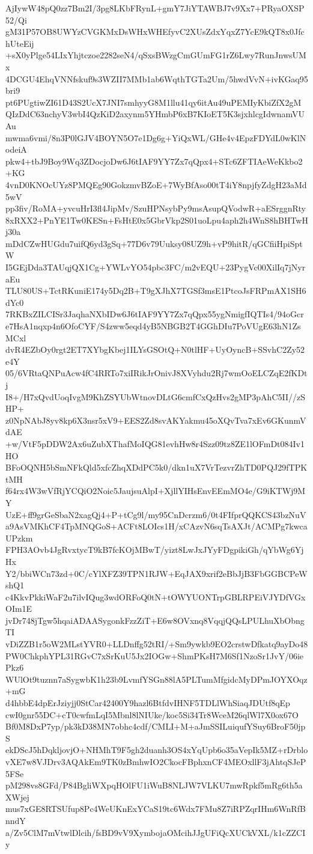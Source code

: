 AjIywW48pQ0zz7Bm2I/3pg8LKbFRynL+gmY7JiYTAWBJ7v9Xx7+PRyaOXSP52/Qi
gM31P57OB8UWYzCVGKMxDsWHxWHEfyvC2XUsZdxYqxZ7YcE9kQT8x0JfchUteEij
+sX0yPlge54LIxYhjtczoe2282seN4/qSxsBWzgCmGUmFG1rZ6Lwy7RunJnwsUMx
4DCGU4EhqVNNfskuf9s3WZII7MMb1ab6WqthTGTa2Um/5hwdVvN+ivKGaq95bri9
pt6PUgtiwZI61D43S2UcX7JNI7smhyyG8M1llu41qy6itAu49uPEMIyKbiZfX2gM
QIzDdC63nchyV3wbI4QzKiD2axynm5YHmbP6xB7KIoET5K3sjxhlcgIdwnamVUAu
mwma6vmi/8n3P0lGJV4BOYN5O7e1Dg6g+YiQxWL/GHe4v4EpzFDYdL0wKlNodeiA
pkw4+tbJ9Boy9Wq3ZDocjoDw6J6tIAF9YY7Zx7qQpx4+STc6ZFTIAeWeKkbo2+KG
4vnD0KNOcUYz8PMQEg90GokzmvBZoE+7WyBfAso00tT4iY8npjfyZdgH23aMd5wV
pp3fiv/RoMA+yvcuHrI3fl4JipMv/SzuHPNsybPy9msAsupQVodwR+aESrggnRty
8xRXX2+PnYE1Tw0KESn+FsHtE0x5GbrVkp2S01uoLpu4aph2h4WnS8hBHTwHj30a
mDdCZwHUGdu7uifQ6yd3gSq+77D6v79Uuksy08UZ9h+vP9hitR/qGCfiiHpiSptW
I5GEjDda3TAUqjQX1Cg+YWLvYO54pbc3FC/m2vEQU+23PygVc00XilIq7jNyraEu
TLU80US+TctRKuniE174y5Dq2B+T9gXJhX7TGSf3msE1PtcoJsFRPmAX1SH6dYc0
7RKBxZILCISr3JaqhaNXbIDw6J6tIAF9YY7Zx7qQpx55ygNmigfIQTIs4/94oGcr
e7HsA1nqxp4n6OfoCYF/S4zww5eqd4yB5NBGB2T4GGhDIu7PoVUgE63hN1ZsMCxl
dvR4EZbOy0rgt2ET7XYbgKbej1ILYsGSOtQ+N0tlHF+UyOyncB+SSvhC2Zy52e4Y
05/6VRtaQNPuAcw4fC4RRTo7xiIRikJrOnivJ8XVyhdu2Rj7wmOoELCZqE2fKDtj
I8+/H7xQvdUoqIvgM9KhZSYUbWtnovDLtG6cmfCxQzHvs2gMP3pAhC5II//zSHP+
z0NpNAbJ8yv8kp6X3nsr5xV9+EES2Zd8svAKYakmu45oXQvTva7xEv6GKunmVdAE
+w/VtF5pDDW2Ax6uZubXThafMoIQG81evhHw8r4Szz09tz8ZE1lOFmDt084Iv1HO
BFoOQNH5bSmNFkQld5xfcZhqXDdPC5k0/dkn1uX7VrTezvrZhTD0PQJ29fTPKtMH
f64rx4W3wVfRjYCQiO2Noic5JaujsuAlpI+XjllYIHsEnvEEmMO4e/G9iKTWj9MY
UzE+ff9grGeSbaN2xagQj4+P+tCg9l/my95CnDcrzm6/0t4FIfprQQKCS43bzNuV
a9AsVMKhCF4TpMNQGoS+ACFt8LOIcs1H/xCAzvN6sqTsAXJt/ACMPg7kwcaUPzkm
FPH3AOvb4JgRvxtycT9kB7fcKOjMBwT/yizt8LwJxJYyFDgpikiGh/qYbWg6YjHx
Y2/bbiWCn73zd+0C/cYlXFZ39TPN1RJW+EqJAX9xrif2eBbJjB3FbGGBCPeWshQ1
c4KkvPkkiWaF2u7ilvIQug3wdORFoQ0tN+tOWYUONTrpGBLRPEiVJYDfVGxOIm1E
jvDr748jTgw5hqaiADAASygonkFzzZiT+E6w8OVxnq8VqqjQQsLPULhuXbObngTI
vDiZZB1r5oW2MLstYVR0+LLDnffg52tRI/+Sm9ywkb9EO2crstwDfkatq9ayDo48
PW0ChkphYPL31RGvC7xSrKuU5Jx2IOGw+ShmPKsH7M6Sf1NzoSr1JvY/06iePkz6
WUlOt9tuznn7aSygwbK1h23b9LvmfYSGn88lA5PLTumMfgidcMyDPmJOYXOqz+mG
d4hbbE4dpErJziyjj0StCar42400Y9hazl6BtfdvIHNF5TDLlWhSiaqJDUtf8qEp
cwI0gnr55DC+cT0cwfmLqI5Mbnl8lNIUke/koc5Si34Tr8WceM26qlWl7X0ox67O
Bf0M8DxP7yp/pk3kD38MN7obhc4cdf/CMLI+M+aJmSSILuiqufYSuy6BroF50jpS
ekDScJ5hDqkljovjO+NHMhT9F5gh2duanh3OS4xYqUpb6o35aVepIk5MZ+rDrblo
vXE7w8VJDrv3AQAkEm9TK0zBmhwIO2CkocFBphxnCF4MEOxllF3jAhtqSJeP5FSe
pM298vs8GFd/P84BgliWXpqHOlFU1iWuB8NLJW7VLKU7mwRpkf5mRg6th5aXWjej
mus7xGE8RTSUfup8Pc4WeUKnExYCaS19tc6Wdx7FMu8Z7iRPZqrIHm6WnRfBnndY
a/Zv5ClM7mVtwlDlcih/fsBD9vV9XymbojaOMcihJJgUFiQcXUCkVXL/k1cZZCIy
